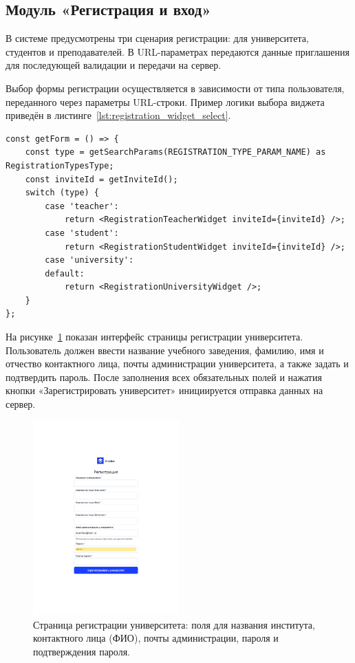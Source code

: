 \subsection{Модуль «Регистрация и вход»}

В системе предусмотрены три сценария регистрации: для университета, студентов и преподавателей. В URL-параметрах передаются данные приглашения для последующей валидации и передачи на сервер.

Выбор формы регистрации осуществляется в зависимости от типа пользователя, переданного через параметры URL-строки. Пример логики выбора виджета приведён в листинге~\ref{lst:registration_widget_select}.

\begin{lstlisting}[caption={Выбор виджета регистрации по типу}, label={lst:registration_widget_select}]
const getForm = () => {
    const type = getSearchParams(REGISTRATION_TYPE_PARAM_NAME) as RegistrationTypesType;
    const inviteId = getInviteId();
    switch (type) {
        case 'teacher':
            return <RegistrationTeacherWidget inviteId={inviteId} />;
        case 'student':
            return <RegistrationStudentWidget inviteId={inviteId} />;
        case 'university':
        default:
            return <RegistrationUniversityWidget />;
    }
};
\end{lstlisting}
На рисунке~\ref{fig:registration_university} показан интерфейс страницы регистрации университета. Пользователь должен ввести название учебного заведения, фамилию, имя и отчество контактного лица, почты администрации университета, а также задать и подтвердить пароль. После заполнения всех обязательных полей и нажатия кнопки «Зарегистрировать университет» инициируется отправка данных на сервер.

\begin{figure}[h]
    \centering
    \includegraphics[width=0.5\textwidth]{static/presintation/RegPage.png} %
    \caption{Страница регистрации университета: поля для названия института, контактного лица (ФИО), почты администрации, пароля и подтверждения пароля.}
    \label{fig:registration_university}
\end{figure}

